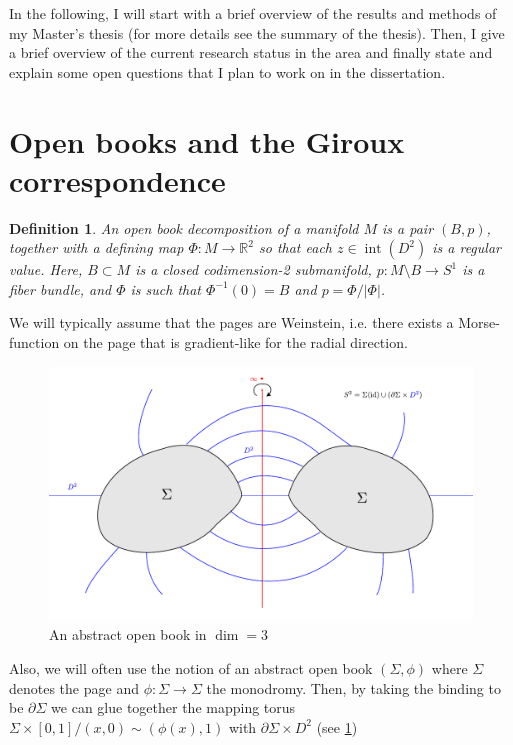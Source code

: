\documentclass{amsart}
\newtheorem{definition}{Definition}
\begin{document}
In the following, I will start with a brief overview of the results and methods of my Master's thesis (for more details see the summary of the thesis).
Then, I give a brief overview of the current research status in the area and
finally state and explain some open questions that I plan to work on in the dissertation.

\section*{Open books and the Giroux correspondence}
\begin{definition}
    An open book decomposition of a manifold $M$ is a pair $(B, p)$, together with a defining map $\Phi:M \to \mathbb R^2$ so that each $z \in \operatorname{int}(D^2)$ is a regular value.
    Here, $B \subset M$ is a closed codimension-2 submanifold, $p: M\setminus B \to S^1$ is a fiber bundle, and $\Phi$ is such that $\Phi^{-1}(0) = B$ and $p =  \Phi / |\Phi|$.
\end{definition}
We will typically assume that the pages are Weinstein, i.e. there exists a Morse-function on the page that is gradient-like for the radial direction.


\begin{figure}
    \includegraphics*[width=\textwidth]{../document/images/abstract_open_book.pdf}
    \caption{An abstract open book in $\dim = 3$}
    \label{fig:abstract_open_book}
\end{figure}

Also, we will often use the notion of an abstract open book $(\Sigma, \phi)$
where $\Sigma$ denotes the page and $\phi: \Sigma \to \Sigma$ the monodromy.
Then, by taking the binding to be $\partial \Sigma$ we can glue together the 
mapping torus $\Sigma \times [0,1] / (x, 0) \sim (\phi(x), 1)$
with $\partial \Sigma \times D^2$ (see \cref{fig:abstract_open_book})
\end{document}

